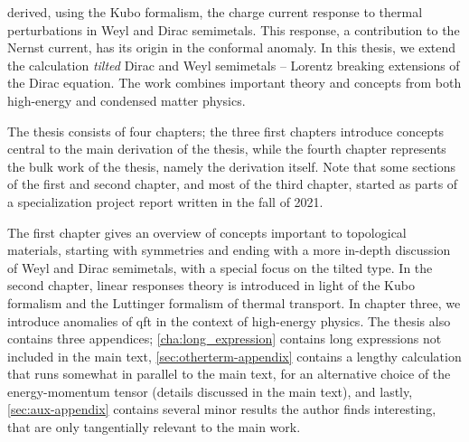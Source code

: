 \textcite{arjonaFingerprintsConformalAnomaly2019} derived, using the Kubo formalism, the charge current response to thermal perturbations in Weyl and Dirac semimetals.
This response, a contribution to the Nernst current, has its origin in the conformal anomaly.
In this thesis, we extend the calculation \emph{tilted} Dirac and Weyl semimetals -- Lorentz breaking extensions of the Dirac equation.
The work combines important theory and concepts from both high-energy and condensed matter physics.

The thesis consists of four chapters;
the three first chapters introduce concepts central to the main derivation of the thesis, while the fourth chapter represents the bulk work of the thesis, namely the derivation itself.
Note that some sections of the first and second chapter, and most of the third chapter, started as parts of a specialization project report written in the fall of 2021.

The first chapter gives an overview of concepts important to topological materials, starting with symmetries and ending with a more in-depth discussion of Weyl and Dirac semimetals, with a special focus on the tilted type.
In the second chapter, linear responses theory is introduced in light of the Kubo formalism and the Luttinger formalism of thermal transport.
In chapter three, we introduce anomalies of \gls{qft} in the context of high-energy physics.
The thesis also contains three appendices;
\cref{cha:long_expression} contains long expressions not included in the main text, \cref{sec:otherterm-appendix} contains a lengthy calculation that runs somewhat in parallel to the main text, for an alternative choice of the energy-momentum tensor (details discussed in the main text), and lastly, \cref{sec:aux-appendix} contains several minor results the author finds interesting, that are only tangentially relevant to the main work.


